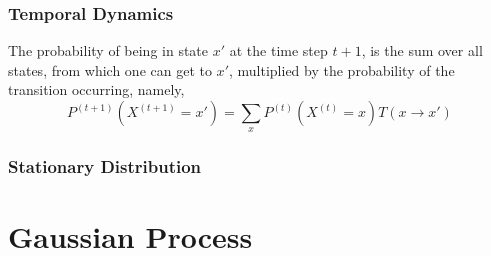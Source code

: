 \documentclass{article}
\begin{document}
\subsubsection{Temporal Dynamics}
    The probability of being in state $x'$ at the time step $t+1$, is the sum over all states, from which one can get to $x'$, multiplied by the probability of the transition occurring, namely, 
$$ P^{(t+1)}(X^{(t+1)} = x') = \sum_x P^{(t)}(X^{(t)} = x)T(x \rightarrow x')$$

\subsubsection{Stationary Distribution}


\section{Gaussian Process}
\end{document}

